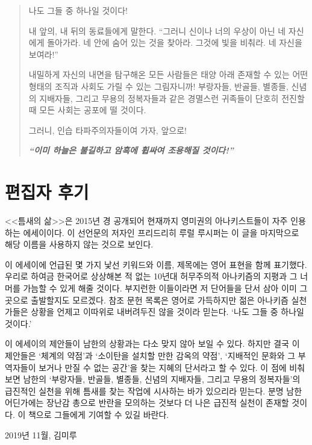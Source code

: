 \documentclass[10pt, b6paper, openany]{memoir}
\begin{document}
\begin{article}
\begin{quote}
나도 그들 중 하나일 것이다! 

내 앞의, 내 뒤의 동료들에게 말한다. ``그러니 신이나 너의 우상이 아닌 네 자신에게 돌아가라. 네 안에 숨어 있는 것을 찾아라. 그것에 빛을 비춰라. 네 자신을 보여라!'' 

내밀하게 자신의 내면을 탐구해온 모든 사람들은 태양 아래 존재할 수 있는 어떤 형태의 조직과 사회도 가릴 수 있는 그림자니까! 부랑자들, 반골들, 별종들, 신념의 지배자들, 그리고 무용의 정복자들과 같은 경멸스런 귀족들이 단호히 전진할 때 모든 사회는 공포에 떨 것이다. 

그러니, 인습 타파주의자들이여 가자, 앞으로! 

\textit{\textbf{``이미 하늘은 불길하고 암흑에 휩싸여 조용해질 것이다!''}}\parencite{ibk:renzo2012}
\end{quote}
\end{article}

\chapter{편집자 후기}

<<틈새의 삶>>은 2015년 경 공개되어 현재까지 영미권의 아나키스트들이 자주 인용하는 에세이이다. 이 선언문의 저자인 프리드리히 루럴 루시퍼는 이 글을 마지막으로 해당 이름을 사용하지 않는 것으로 보인다. 

이 에세이에 언급된 몇 가지 낯선 키워드와 이름, 제목에는 영어 표현을 함께 표기했다. 우리로 하여금 한국어로 상상해본 적 없는 10년대 허무주의적 아나키즘의 지평과 그 너머를 가늠할 수 있게 해줄 것이다. 부지런한 이들이라면 저 단어들을 단서 삼아 이미 그곳으로 출발할지도 모르겠다. 참조 문헌 목록은 영어로 가득하지만 젊은 아나키즘 실천가들은 상황을 언제고 이따위로 내버려두진 않을 것이라 믿는다. `나도 그들 중 하나일 것이다.'

이 에세이의 제안들이 남한의 상황과는 다소 맞지 않아 보일 수 있다. 하지만 결국 이 제안들은 `체계의 약점'과 `소이탄을 설치할 만한 감옥의 약점', `지배적인 문화와 그 부역자들이 보거나 만질 수 없는 공간'을 찾는 지혜의 단서라고 할 수 있다. 이 점에 비춰보면 남한의 `부랑자들, 반골들, 별종들, 신념의 지배자들, 그리고 무용의 정복자들'의 급진적인 실천을 위해 틈새를 찾는 작업에 시사하는 바가 있으리라 믿는다. 분명 남한 어딘가에는 장난감 총으로 반란을 모의하는 것보다 더 나은 급진적 실천이 존재할 것이다. 이 책으로 그들에게 기여할 수 있길 바란다.

\begin{flushright}
2019년 11월, 김미루
\end{flushright}

\backmatter
\end{document}
